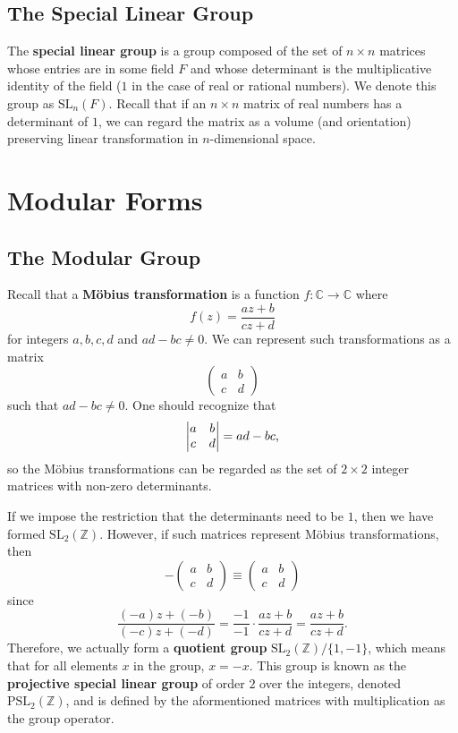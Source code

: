 \documentclass{microdoc}
\newcommand{\SL}{\ensuremath{\mathrm{SL}}}
\newcommand{\PSL}{\ensuremath{\mathrm{PSL}}}
\newcommand{\defn}[1]{\textbf{#1}}
\begin{document}
\subsection{The Special Linear Group}
The \defn{special linear group} is a group composed of the set of
$n\times n$ matrices whose entries are in some field $F$ and whose
determinant is the multiplicative identity of the field ($1$ in the
case of real or rational numbers). We denote this group as
$\SL_n(F)$. Recall that if an $n\times n$ matrix of real numbers has a
determinant of $1$, we can regard the matrix as a volume (and
orientation) preserving linear transformation in $n$-dimensional
space.

\section{Modular Forms}
\subsection{The Modular Group}
Recall that a \defn{M\"obius transformation} is a function
$f:\mathbb{C}\to\mathbb{C}$ where \[f(z) = \frac{az+b}{cz+d}\] for
integers $a,b,c,d$ and $ad-bc\neq 0$. We can represent such
transformations as a matrix
\[
\begin{pmatrix}
a & b\\
c & d
\end{pmatrix}
\]
such that $ad-bc\neq 0$. One should recognize that
\[
\begin{vmatrix}
  a & b\\
  c & d
\end{vmatrix}
= ad-bc\text,
\]
so the M\"obius transformations can be regarded as the set of $2\times
2$ integer matrices with non-zero determinants.

If we impose the restriction that the determinants need to be $1$,
then we have formed $\SL_2(\mathbb{Z})$. However, if such matrices
represent M\"obius transformations, then
\[
-
\begin{pmatrix}
a & b\\
c & d
\end{pmatrix}
\equiv
\begin{pmatrix}
a & b\\
c & d
\end{pmatrix}
\]
since
\[
\frac{(-a)z+(-b)}{(-c)z+(-d)} = \frac{-1}{-1} \cdot \frac{az+b}{cz+d} = \frac{az+b}{cz+d}\text{.}
\]
Therefore, we actually form a \defn{quotient group}
$\SL_2(\mathbb{Z})/\{1,-1\}$, which means that for all elements $x$ in
the group, $x = -x$. This group is known as the \defn{projective
  special linear group} of order $2$ over the integers, denoted
$\PSL_2(\mathbb{Z})$, and is defined by the aformentioned matrices
with multiplication as the group operator.
\end{document}

